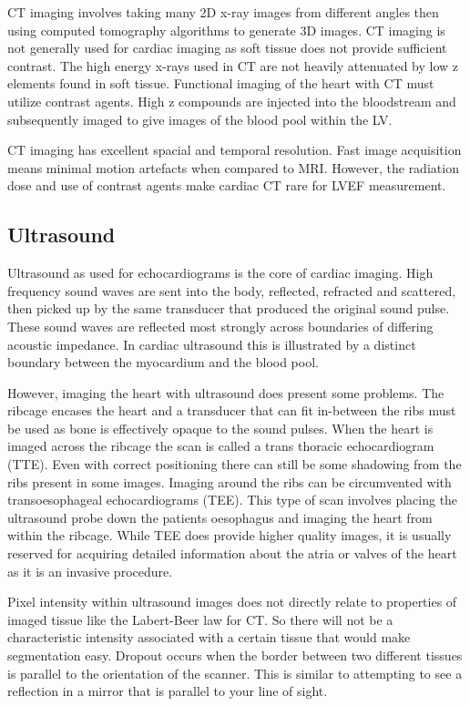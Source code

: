 \documentclass[12pt]{article}
\begin{document}
CT imaging involves taking many 2D x-ray images from different angles then using computed tomography algorithms to generate 3D images.
CT imaging is not generally used for cardiac imaging as soft tissue does not provide sufficient contrast.
The high energy x-rays used in CT are not heavily attenuated by low z elements found in soft tissue.
Functional imaging of the heart with CT must utilize contrast agents\cite{ef_soa}.
High z compounds are injected into the bloodstream and subsequently imaged to give images of the blood pool within the LV.
\par 
CT imaging has excellent spacial and temporal resolution. 
Fast image acquisition means minimal motion artefacts when compared to MRI.
However, the radiation dose and use of contrast agents make cardiac CT rare for LVEF measurement.


\subsection{Ultrasound}
Ultrasound as used for echocardiograms is the core of cardiac imaging. 
High frequency sound waves are sent into the body, reflected, refracted and scattered, then picked up by the same transducer that produced the original sound pulse. 
These sound waves are reflected most strongly across boundaries of differing acoustic impedance.
In  cardiac ultrasound this is illustrated by a distinct boundary between the myocardium and the blood pool.
\par 
However, imaging the heart with ultrasound does present some problems.
The ribcage encases the heart and a transducer that can fit in-between the ribs must be used as bone is  effectively opaque to the sound pulses. 
When the heart is imaged across the ribcage the scan is called a trans thoracic echocardiogram (TTE).
Even with correct positioning there can still be some shadowing from the ribs present in some images.
Imaging around the ribs can be circumvented with transoesophageal echocardiograms (TEE). 
This type of scan involves placing the ultrasound probe down the patients oesophagus and imaging the heart from within the ribcage.
While TEE does provide higher quality images, it is usually reserved for acquiring detailed information about the atria or valves of the heart as it is an invasive procedure.

Pixel intensity within ultrasound images does not directly relate to properties of imaged tissue like the Labert-Beer law for CT. So there will not be a characteristic intensity associated with a certain tissue that would make segmentation easy.
Dropout occurs when the border between two different tissues is parallel to the orientation of the scanner. 
This is similar to attempting to see a reflection in a mirror that is parallel to your line of sight.
\end{document}
